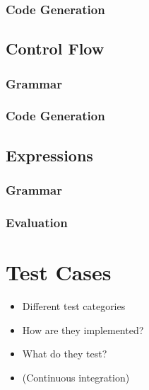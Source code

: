 \subsubsection{Code Generation}

\subsection{Control Flow}
\label{sec:control_flow}
\subsubsection{Grammar}
\subsubsection{Code Generation}

\subsection{Expressions}
\subsubsection{Grammar}
\subsubsection{Evaluation}

\section{Test Cases}
\begin{itemize}
    \item Different test categories
    \item How are they implemented?
    \item What do they test?
    \item (Continuous integration) 
\end{itemize}